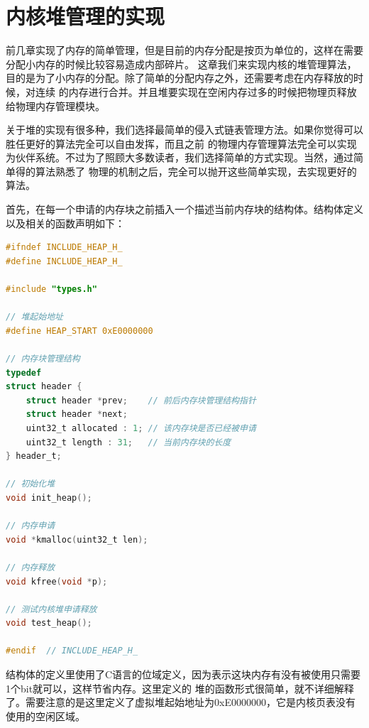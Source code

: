 
\section {内核堆管理的实现}

\par 前几章实现了内存的简单管理，但是目前的内存分配是按页为单位的，这样在需要分配小内存的时候比较容易造成内部碎片。\allowbreak
这章我们来实现内核的堆管理算法，目的是为了小内存的分配。除了简单的分配内存之外，还需要考虑在内存释放的时候，对连续\allowbreak
的内存进行合并。并且堆要实现在空闲内存过多的时候把物理页释放给物理内存管理模块。

\par 关于堆的实现有很多种，我们选择最简单的侵入式链表管理方法。如果你觉得可以胜任更好的算法完全可以自由发挥，而且之前\allowbreak
的物理内存管理算法完全可以实现为伙伴系统。不过为了照顾大多数读者，我们选择简单的方式实现。当然，通过简单得的算法熟悉了\allowbreak
物理的机制之后，完全可以抛开这些简单实现，去实现更好的算法。

\par 首先，在每一个申请的内存块之前插入一个描述当前内存块的结构体。结构体定义以及相关的函数声明如下：

\begin{lstlisting}[language = C, caption = include/heap.h]
#ifndef INCLUDE_HEAP_H_
#define INCLUDE_HEAP_H_

#include "types.h"

// 堆起始地址
#define HEAP_START 0xE0000000

// 内存块管理结构
typedef
struct header {
	struct header *prev; 	// 前后内存块管理结构指针
	struct header *next;
	uint32_t allocated : 1;	// 该内存块是否已经被申请
	uint32_t length : 31; 	// 当前内存块的长度
} header_t;

// 初始化堆
void init_heap();

// 内存申请
void *kmalloc(uint32_t len);

// 内存释放
void kfree(void *p);

// 测试内核堆申请释放
void test_heap();

#endif 	// INCLUDE_HEAP_H_
\end{lstlisting}

\par 结构体的定义里使用了C语言的位域定义，因为表示这块内存有没有被使用只需要1个bit就可以，这样节省内存。这里定义的\allowbreak
堆的函数形式很简单，就不详细解释了。需要注意的是这里定义了虚拟堆起始地址为0xE0000000，它是内核页表没有使用的空闲区域。

